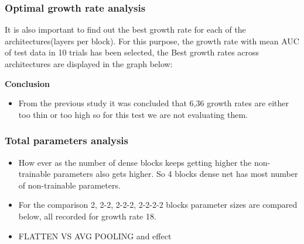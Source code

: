 \subsubsection{Optimal growth rate analysis}
It is also important to find out the best growth rate for each of the architectures(layers per block). For this purpose, the growth rate with mean AUC of test data in 10 trials has been selected,
the Best growth rates across architectures are displayed in the graph below: 




\textbf{Conclusion}
\begin{itemize}
 \item From the previous study it was concluded that 6,36 growth rates are either too thin or too high so for this test we are not evaluating them.
\end{itemize}

\subsubsection{Total parameters analysis}
\begin{itemize}
 \item How ever as the number of dense blocks keeps getting higher the non-trainable parameters also gets higher. So 4 blocks dense net has most number of non-trainable parameters.
 \item For the comparison 2, 2-2, 2-2-2, 2-2-2-2 blocks parameter sizes are compared below, all recorded for growth rate 18.
 \item FLATTEN VS AVG POOLING and effect
\end{itemize}



